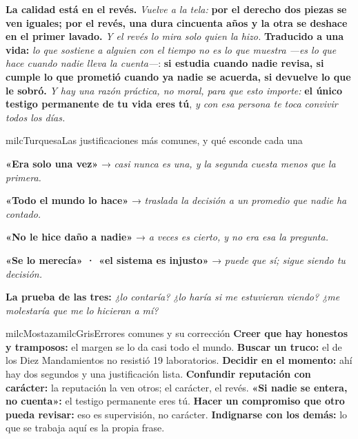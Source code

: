 \documentclass[11pt,letterpaper]{article}
\newcommand{\milcpaso}[3]{%
\Needspace{4\baselineskip}%
\begin{tcolorbox}[enhanced,colback=white,colframe=milcLinea,arc=1.5mm,boxrule=.9pt,
  left=14mm,right=4mm,top=3mm,bottom=3mm,before skip=4pt,after skip=4pt,
  fontupper=\RaggedRight,
  overlay={\node[anchor=north west,circle,fill=#2,text=white,inner sep=0pt,
    minimum size=7.4mm,font=\sffamily\bfseries\small]
    at ([xshift=3.6mm,yshift=-3.2mm]frame.north west) {#1};}]
#3
\end{tcolorbox}}
\begin{document}
\milcpaso{4}{milcTurquesa}{\textbf{La calidad está en el revés.} \emph{Vuelve a la tela:} \textbf{por el derecho dos piezas se ven iguales; por el revés, una dura cincuenta años y la otra se deshace en el primer lavado.} \emph{Y el revés lo mira solo quien la hizo.} \textbf{Traducido a una vida:} \emph{lo que sostiene a alguien con el tiempo no es lo que muestra ---es lo que hace cuando nadie lleva la cuenta---}: \textbf{si estudia cuando nadie revisa, si cumple lo que prometió cuando ya nadie se acuerda, si devuelve lo que le sobró.} \emph{Y hay una razón práctica, no moral, para que esto importe:} \textbf{el único testigo permanente de tu vida eres tú}, \emph{y con esa persona te toca convivir todos los días.}}

\begin{drawbox}{milcTurquesa}{Las justificaciones más comunes, y qué esconde cada una}
\begin{pasoslista}
\item \textbf{«Era solo una vez»} → \emph{casi nunca es una, y la segunda cuesta menos que la primera.}
\item \textbf{«Todo el mundo lo hace»} → \emph{traslada la decisión a un promedio que nadie ha contado.}
\item \textbf{«No le hice daño a nadie»} → \emph{a veces es cierto, y no era esa la pregunta.}
\item \textbf{«Se lo merecía» · «el sistema es injusto»} → \emph{puede que sí; sigue siendo tu decisión.}
\item \textbf{La prueba de las tres:} \emph{¿lo contaría? ¿lo haría si me estuvieran viendo? ¿me molestaría que me lo hicieran a mí?}
\end{pasoslista}
\end{drawbox}

\begin{softbox}{milcMostaza}{milcGris}{Errores comunes y su corrección}
\textbf{Creer que hay honestos y tramposos:} el margen se lo da casi todo el mundo. \textbf{Buscar un truco:} el de los Diez Mandamientos no resistió 19 laboratorios. \textbf{Decidir en el momento:} ahí hay dos segundos y una justificación lista. \textbf{Confundir reputación con carácter:} la reputación la ven otros; el carácter, el revés. \textbf{«Si nadie se entera, no cuenta»:} el testigo permanente eres tú. \textbf{Hacer un compromiso que otro pueda revisar:} eso es supervisión, no carácter. \textbf{Indignarse con los demás:} lo que se trabaja aquí es la propia frase.
\end{softbox}
\end{document}
